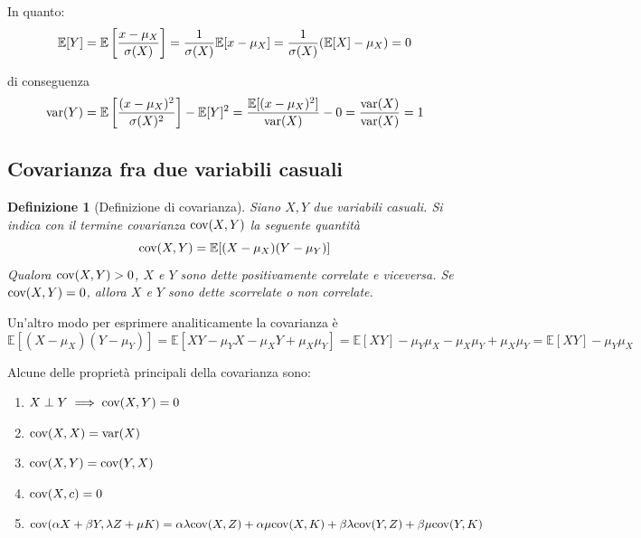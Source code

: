 \documentclass{article}
\newtheorem{definition}{Definizione}
\begin{document}
            In quanto:
            \[
                \mathbb{E}[Y] = \mathbb{E}\qty[\frac{x - \mu_{X}}{\sigma(X)}] = \frac{1}{\sigma(X)} \mathbb{E}[x - \mu_{X}] = \frac{1}{\sigma(X)} (\mathbb{E}[X] - \mu_{X}) = 0
            \]
            
            di conseguenza
            \[
                \textnormal{var}(Y) = \mathbb{E}\qty[\frac{(x - \mu_{X})^{2}}{\sigma(X)^{2}}] - \mathbb{E}[Y]^{2} = 
                \frac{\mathbb{E}[(x - \mu_{X})^{2}]}{\textnormal{var}(X)} - 0 = 
                \frac{\textnormal{var}(X)}{\textnormal{var}(X)} = 
                1
            \]

        \vspace{10pt}
        \subsection{Covarianza fra due variabili casuali}
            \begin{definition}[Definizione di covarianza]
                Siano $X, Y$ due variabili casuali.
                Si indica con il termine covarianza $\textnormal{cov}(X, Y)$ la seguente quantità
                \[
                    \textnormal{cov}(X, Y) = \mathbb{E}[(X - \mu_{X})(Y - \mu_{Y})]
                \]
                Qualora $\textnormal{cov}(X, Y) > 0$, $X$ e $Y$ sono dette positivamente correlate e viceversa.
                Se $\textnormal{cov}(X, Y) = 0$, allora $X$ e $Y$ sono dette scorrelate o non correlate.
            \end{definition}

            Un'altro modo per esprimere analiticamente la covarianza è
            \[
                \mathbb{E}[(X - \mu_{X})(Y - \mu_{Y})] = \mathbb{E}[XY - \mu_{Y}X - \mu_{X}Y + \mu_{X}\mu_{Y}] =
                \mathbb{E}[XY] - \mu_{Y}\mu_{X} - \mu_{X}\mu_{Y} + \mu_{X}\mu_{Y} = 
                \mathbb{E}[XY] - \mu_{Y}\mu_{X}
            \]

            Alcune delle proprietà principali della covarianza sono:
            \begin{enumerate}
                \item $X \perp Y \implies \textnormal{cov}(X, Y) = 0$
                \item $\textnormal{cov}(X, X) = \textnormal{var}(X)$
                \item $\textnormal{cov}(X, Y) = \textnormal{cov}(Y, X)$
                \item $\textnormal{cov}(X, c) = 0$
                \item $\textnormal{cov}(\alpha X + \beta Y, \lambda Z + \mu K) = \alpha \lambda \textnormal{cov}(X, Z) + \alpha \mu \textnormal{cov}(X, K) + \beta \lambda \textnormal{cov}(Y, Z) + \beta \mu \textnormal{cov}(Y, K)$
            \end{enumerate}
\end{document}
